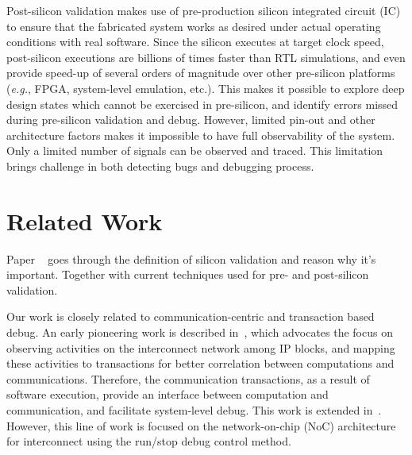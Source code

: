 \documentclass[12pt,frontmatter,copyright,thesis]{usfmanus}
\newcommand{\eg}{\mbox{{\em e.g.}}}
\begin{document}
Post-silicon validation makes use of pre-production silicon
integrated circuit (IC) to ensure that the fabricated system
works as desired under actual operating conditions with real
software.  Since the silicon executes at target clock speed,
post-silicon executions are billions of times faster than
RTL simulations, and even provide speed-up of several orders
of magnitude over other pre-silicon platforms (\eg, FPGA,
system-level emulation, etc.).  This makes it possible to
explore deep design states which cannot be exercised in
pre-silicon, and identify errors missed during pre-silicon
validation and debug.  However, limited pin-out and
other architecture factors makes it impossible to have full observability of the system.
Only a limited number of signals can be observed and traced. This limitation 
brings challenge in both detecting bugs and debugging process. 


\section{Related Work}

Paper ~\cite{validationWall} goes through the definition of
silicon validation and reason why it's important. Together with 
current techniques used for pre- and post-silicon validation.

Our work is closely related to communication-centric and
transaction based debug.  An early pioneering work is
described in~\cite{Goossens2007NOCS}, which advocates the
focus on observing activities on the interconnect network
among IP blocks, and mapping these activities to
transactions for better correlation between computations and
communications.  Therefore, the communication transactions,
as a result of software execution, provide an interface
between computation and communication, and facilitate
system-level debug.  This work is extended
in~\cite{Vermeulen2009VLSI-DAT,Goossens2009DATE}.  However,
this line of work is focused on the network-on-chip (NoC)
architecture for interconnect using the run/stop debug
control method.
\end{document}
